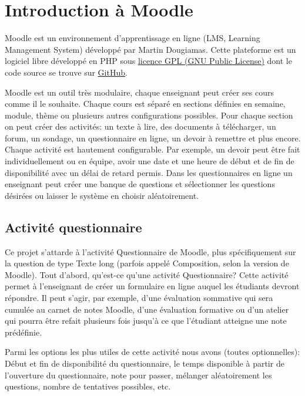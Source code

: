 \chapter{Introduction à Moodle}

Moodle est un environnement d'apprentissage en ligne (LMS, Learning Management System) développé par Martin Dougiamas. Cette plateforme est un logiciel libre développé en PHP sous \href{http://docs.moodle.org/dev/License}{licence GPL (GNU Public License)} dont le code source se trouve sur \href{https://github.com/moodle/moodle}{GitHub}.

Moodle est un outil très modulaire, chaque enseignant peut créer ses cours comme il le souhaite. Chaque cours est séparé en sections définies en semaine, module, thème ou plusieurs autres configurations possibles. Pour chaque section on peut créer des activités: un texte à lire, des documents à télécharger, un forum, un sondage, un questionnaire en ligne, un devoir à remettre et plus encore. Chaque activité est hautement configurable. Par exemple, un devoir peut être fait individuellement ou en équipe, avoir une date et une heure de début et de fin de disponibilité avec un délai de retard permis. Dans les questionnaires en ligne un enseignant peut créer une banque de questions et sélectionner les questions désirées ou laisser le système en choisir aléatoirement.

\section{Activité questionnaire}

Ce projet s'attarde à l'activité Questionnaire de Moodle, plus spécifiquement sur la question de type Texte long (parfois appelé Composition, selon la version de Moodle). Tout d'abord, qu'est-ce qu'une activité Questionnaire? Cette activité permet à l'enseignant de créer un formulaire en ligne auquel les étudiants devront répondre. Il peut s'agir, par exemple, d'une évaluation sommative qui sera cumulée au carnet de notes Moodle, d'une évaluation formative ou d'un atelier qui pourra être refait plusieurs fois jusqu'à ce que l'étudiant atteigne une note prédéfinie.

Parmi les options les plus utiles de cette activité nous avons (toutes optionnelles): Début et fin de disponibilité du questionnaire, le temps disponible à partir de l'ouverture du questionnaire, note pour passer, mélanger aléatoirement les questions, nombre de tentatives possibles, etc.

